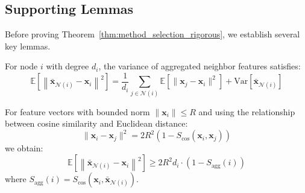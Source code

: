 \subsection{Supporting Lemmas}

Before proving Theorem~\ref{thm:method_selection_rigorous}, we establish several key lemmas.

\begin{lemma}
\label{lem:agg_variance}
For node $i$ with degree $d_i$, the variance of aggregated neighbor features satisfies:
\begin{equation}
\mathbb{E}\left[\left\|\bar{\mathbf{x}}_{\mathcal{N}(i)} - \mathbf{x}_i\right\|^2\right] = \frac{1}{d_i}\sum_{j \in \mathcal{N}(i)} \mathbb{E}\left[\|\mathbf{x}_j - \mathbf{x}_i\|^2\right] + \text{Var}\left[\bar{\mathbf{x}}_{\mathcal{N}(i)}\right]
\end{equation}

For feature vectors with bounded norm $\|\mathbf{x}_i\| \leq R$ and using the relationship between cosine similarity and Euclidean distance:
\begin{equation}
\|\mathbf{x}_i - \mathbf{x}_j\|^2 = 2R^2(1 - S_{\cos}(\mathbf{x}_i, \mathbf{x}_j))
\end{equation}
we obtain:
\begin{equation}
\mathbb{E}\left[\left\|\bar{\mathbf{x}}_{\mathcal{N}(i)} - \mathbf{x}_i\right\|^2\right] \geq 2R^2 d_i \cdot (1 - S_{\text{agg}}(i))
\end{equation}
where $S_{\text{agg}}(i) = S_{\cos}(\mathbf{x}_i, \bar{\mathbf{x}}_{\mathcal{N}(i)})$.
\end{lemma}

